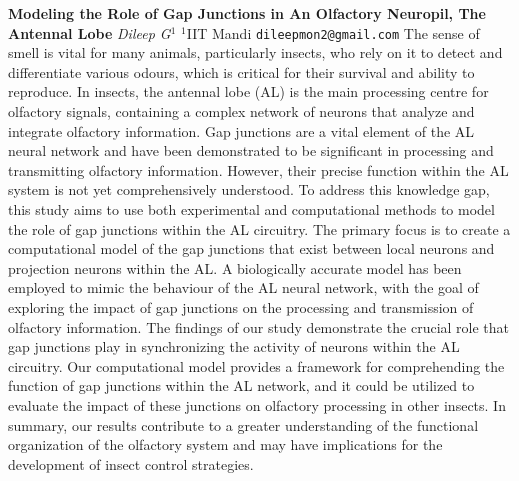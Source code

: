 
    \begin{conf-abstract}[]
        {\textbf{Modeling the Role of Gap Junctions in An Olfactory Neuropil, The Antennal Lobe }}
        {\textit{Dileep G$^{1}$}}
        {$^{1}$IIT Mandi}
        {\texttt{dileepmon2@gmail.com}}
        {The sense of smell is vital for many animals, particularly insects, who rely on it to detect and differentiate various odours, which is critical for their survival and ability to reproduce. In insects, the antennal lobe (AL) is the main processing centre for olfactory signals, containing a complex network of neurons that analyze and integrate olfactory information.  Gap junctions are a vital element of the AL neural network and have been demonstrated to be significant in processing and transmitting olfactory information. However, their precise function within the AL system is not yet comprehensively understood. To address this knowledge gap, this study aims to use both experimental and computational methods to model the role of gap junctions within the AL circuitry. The primary focus is to create a computational model of the gap junctions that exist between local neurons and projection neurons within the AL. A biologically accurate model has been employed to mimic the behaviour of the AL neural network, with the goal of exploring the impact of gap junctions on the processing and transmission of olfactory information. The findings of our study demonstrate the crucial role that gap junctions play in synchronizing the activity of neurons within the AL circuitry. Our computational model provides a framework for comprehending the function of gap junctions within the AL network, and it could be utilized to evaluate the impact of these junctions on olfactory processing in other insects. In summary, our results contribute to a greater understanding of the functional organization of the olfactory system and may have implications for the development of insect control strategies. }
    \end{conf-abstract}
        